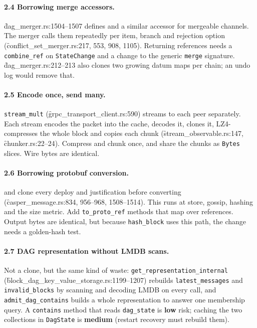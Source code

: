 \documentclass[11pt]{article}
\newcommand{\low}{\textcolor{lo}{\textbf{low}}}
\newcommand{\medium}{\textcolor{med}{\textbf{medium}}}
\begin{document}
\paragraph{2.4 Borrowing merge accessors.} \f{dag_merger.rs}:1504--1507 defines
 and a similar accessor for mergeable channels.
The merger calls them repeatedly per item, branch and rejection option
(\f{conflict_set_merger.rs}:217, 553, 908, 1105). Returning references needs a
\texttt{combine\_ref} on \texttt{StateChange} and a change to the generic \texttt{merge} signature.
\f{dag_merger.rs}:212--213 also clones two growing datum maps per chain; an undo log would
remove that.

\paragraph{2.5 Encode once, send many.} \texttt{stream\_mult}
(\f{grpc_transport_client.rs}:590) streams to each peer separately. Each stream encodes the packet
into the cache, decodes it, clones it, LZ4-compresses the whole block and copies each chunk
(\f{stream_observable.rs}:147, \f{chunker.rs}:22--24). Compress and chunk once, and share the
chunks as \texttt{Bytes} slices. Wire bytes are identical.

\paragraph{2.6 Borrowing protobuf conversion.}  and
 clone every deploy and justification before converting
(\f{casper_message.rs}:834, 956--968, 1508--1514). This runs at store, gossip, hashing and the
size metric. Add \texttt{to\_proto\_ref} methods that map over references. Output bytes are
identical, but because \texttt{hash\_block} uses this path, the change needs a golden-hash test.

\paragraph{2.7 DAG representation without LMDB scans.} Not a clone, but the same kind of waste:
\texttt{get\_representation\_internal}
(\f{block_dag_key_value_storage.rs}:1199--1207) rebuilds \texttt{latest\_messages} and
\texttt{invalid\_blocks} by scanning and decoding LMDB on every call, and
\texttt{admit\_dag\_contains} builds a whole representation to answer one membership query. A
\texttt{contains} method that reads \texttt{dag\_state} is \low{} risk; caching the two
collections in \texttt{DagState} is \medium{} (restart recovery must rebuild them).
\end{document}
